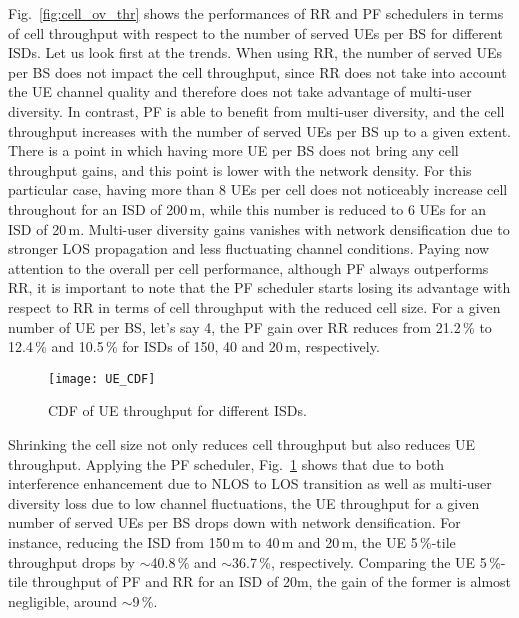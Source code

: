 \documentclass{IEEEtran}
\begin{document}
Fig.~\ref{fig:cell_ov_thr} shows the performances of \ac{RR} and \ac{PF} schedulers in terms of cell throughput with respect to the number of served \acp{UE} per \ac{BS} for different \acp{ISD}.
Let us look first at the trends.
When using \ac{RR},
the number of served \acp{UE} per \ac{BS} does not impact the cell throughput,
since \ac{RR} does not take into account the \ac{UE} channel quality and therefore does not take advantage of multi-user diversity.
In contrast, \ac{PF} is able to benefit from multi-user diversity,
and the cell throughput increases with the number of served \acp{UE} per \ac{BS} up to a given extent.
There is a point in which having more \ac{UE} per \ac{BS} does not bring any cell throughput gains,
and this point is lower with the network density.
For this particular case,
having more than 8 \acp{UE} per cell does not noticeably increase cell throughout for an \ac{ISD} of 200\,m,
while this number is reduced to 6 \acp{UE} for an ISD of 20\,m.
Multi-user diversity gains vanishes with network densification due to stronger \ac{LOS} propagation and less fluctuating channel conditions.
Paying now attention to the overall per cell performance,
although \ac{PF} always outperforms \ac{RR},
it is important to note that the \ac{PF} scheduler starts losing its advantage with respect to \ac{RR} in terms of cell throughput with the reduced cell size.
For a given number of \ac{UE} per \ac{BS}, let's say 4,
the \ac{PF} gain over \ac{RR} reduces from 21.2\,\% to 12.4\,\% and 10.5\,\% for ISDs of 150, 40 and 20\,m, respectively.

\begin{figure}[t]
	\centering
	\texttt{[image: UE\_CDF]}
	\caption{CDF of UE throughput for different ISDs.}
	\label{fig:ue_cdf}
\end{figure}

Shrinking the cell size not only reduces cell throughput but also reduces \ac{UE} throughput.
Applying the \ac{PF} scheduler,
Fig.~\ref{fig:ue_cdf} shows that due to both interference enhancement due to NLOS to LOS transition as well as multi-user diversity loss due to low channel fluctuations,
the \ac{UE} throughput for a given number of served \acp{UE} per \ac{BS} drops down with network densification. 
For instance, reducing the \ac{ISD} from 150\,m to 40\,m and 20\,m, the \ac{UE} 5\,\%-tile throughput drops by $\sim$40.8\,\% and $\sim$36.7\,\%, respectively. 
Comparing the \ac{UE} 5\,\%-tile throughput of \ac{PF} and \ac{RR} for an ISD of 20m,
the gain of the former is almost negligible, around $\sim$9\,\%.
\end{document}
